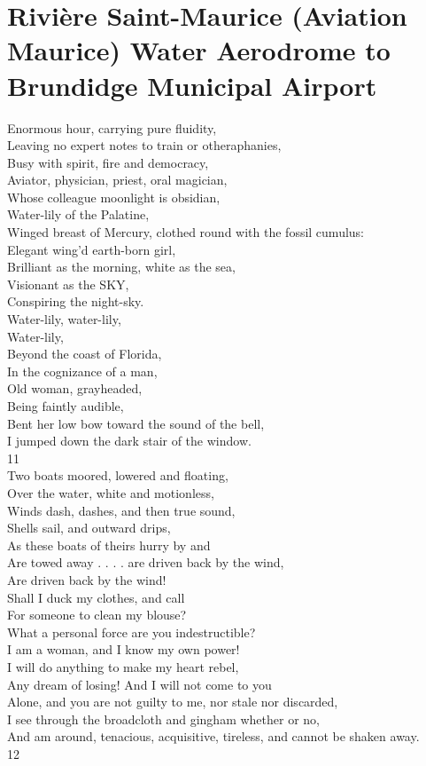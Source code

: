 \documentclass[smalldemyvopaper,11pt,twoside,onecolumn,openright,extrafontsizes]{memoir}
\begin{document}
\chapter{Rivière Saint-Maurice (Aviation Maurice) Water Aerodrome to Brundidge Municipal Airport}
Enormous hour, carrying pure fluidity,
\\Leaving no expert notes to train or otheraphanies,
\\Busy with spirit, fire and democracy,
\\Aviator, physician, priest, oral magician,
\\Whose colleague moonlight is obsidian,
\\Water-lily of the Palatine,
\\Winged breast of Mercury, clothed round with the fossil cumulus:
\\Elegant wing'd earth-born girl,
\\Brilliant as the morning, white as the sea,
\\Visionant as the SKY,
\\Conspiring the night-sky.
\\Water-lily, water-lily,
\\Water-lily,
\\Beyond the coast of Florida,
\\In the cognizance of a man,
\\Old woman, grayheaded,
\\Being faintly audible,
\\Bent her low bow toward the sound of the bell,
\\I jumped down the dark stair of the window.
\\11
\\Two boats moored, lowered and floating,
\\Over the water, white and motionless,
\\Winds dash, dashes, and then true sound,
\\Shells sail, and outward drips,
\\As these boats of theirs hurry by and
\\Are towed away . . . . are driven back by the wind,
\\Are driven back by the wind!
\\Shall I duck my clothes, and call
\\For someone to clean my blouse?
\\What a personal force are you indestructible?
\\I am a woman, and I know my own power!
\\I will do anything to make my heart rebel,
\\Any dream of losing! And I will not come to you
\\Alone, and you are not guilty to me, nor stale nor discarded,
\\I see through the broadcloth and gingham whether or no,
\\And am around, tenacious, acquisitive, tireless, and cannot be shaken away.
\\12
\end{document}
